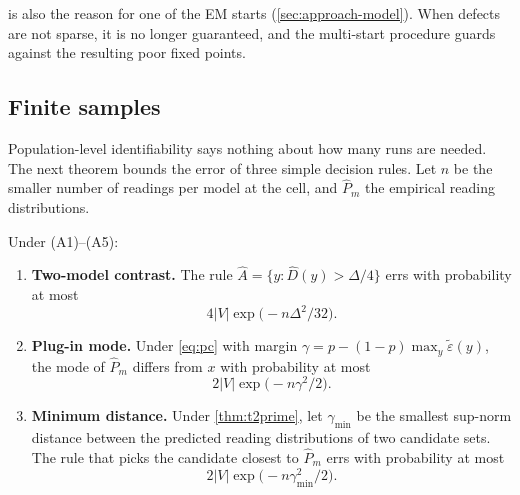  is also the reason for one of the EM starts (\cref{sec:approach-model}). When defects are not sparse, it is no longer guaranteed, and the multi-start procedure guards against the resulting poor fixed points.

\subsection{Finite samples}

Population-level identifiability says nothing about how many runs are needed. The next theorem bounds the error of three simple decision rules. Let $n$ be the smaller number of readings per model at the cell, and $\hat P_m$ the empirical reading distributions.

\begin{theorem}
\label{thm:t4}
Under (A1)--(A5):
\begin{enumerate}[leftmargin=*,label=(\alph*)]
\item \textbf{Two-model contrast.} The rule $\hat A=\{y:\hat D(y)>\Delta/4\}$ errs with probability at most
  \begin{equation}\label{eq:t4a}
  4|V|\exp\bigl(-n\Delta^2/32\bigr).
  \end{equation}
\item \textbf{Plug-in mode.} Under \eqref{eq:pc} with margin $\gamma=p-(1-p)\max_y\tilde\varepsilon(y)$, the mode of $\hat P_m$ differs from $x$ with probability at most
  \begin{equation}\label{eq:t4b}
  2|V|\exp\bigl(-n\gamma^2/2\bigr).
  \end{equation}
\item \textbf{Minimum distance.} Under \cref{thm:t2prime}, let $\gamma_{\min}$ be the smallest sup-norm distance between the predicted reading distributions of two candidate sets. The rule that picks the candidate closest to $\hat P_m$ errs with probability at most
  \begin{equation}\label{eq:t4c}
  2|V|\exp\bigl(-n\gamma_{\min}^2/2\bigr).
  \end{equation}
\end{enumerate}
\end{theorem}

